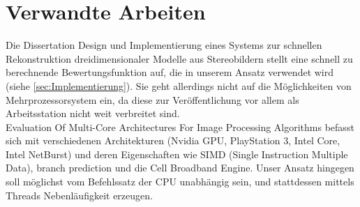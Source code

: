 \documentclass[%
  a4paper,%
  12pt,%
  style=screen, %
  oneside,
  blue,%
  ]{tubsartcl}
\begin{document}

\section{Verwandte Arbeiten}
Die Dissertation \glqq{}Design und Implementierung eines Systems zur schnellen Rekonstruktion dreidimensionaler Modelle
aus Stereobildern\grqq{} \cite{muhlmann2002} stellt eine schnell zu berechnende Bewertungsfunktion auf, die in unserem
Ansatz verwendet wird (siehe \autoref{sec:Implementierung}). Sie geht allerdings nicht auf die Möglichkeiten von
Mehrprozessorsystem ein, da diese zur Veröffentlichung \glqq{} vor allem als Arbeitsstation nicht weit verbreitet
sind\grqq{}\cite[S. 110]{muhlmann2002}.  \\
\glqq{}Evaluation Of Multi-Core Architectures For Image Processing Algorithms\grqq{}
\cite{patil2009evaluation} befasst sich mit verschiedenen Architekturen (Nvidia GPU, PlayStation 3, Intel Core, Intel
NetBurst) und deren Eigenschaften wie SIMD (Single Instruction Multiple Data), branch
prediction und die Cell Broadband Engine. Unser Ansatz hingegen soll möglichst vom Befehlssatz der CPU unabhängig sein,
und stattdessen mittels Threads Nebenläufigkeit erzeugen.
\end{document}
